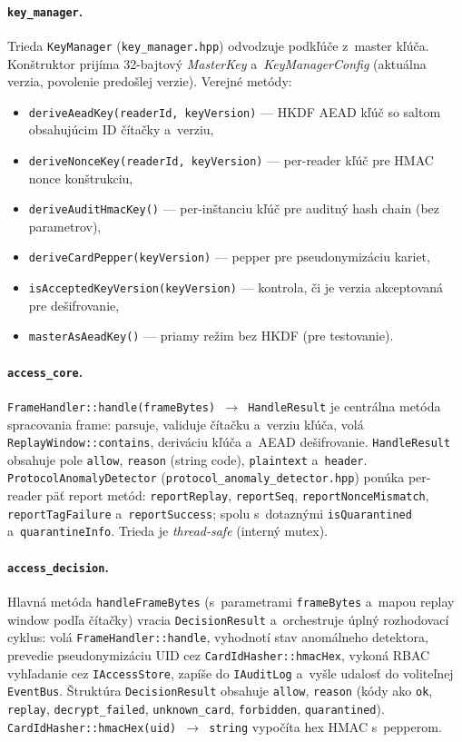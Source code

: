 \documentclass[a4paper]{feidipsp}
\begin{document}
\paragraph{\texttt{key\_manager}.}
Trieda \texttt{KeyManager} (\texttt{key\_manager.hpp}) odvodzuje podkľúče z~master kľúča. Konštruktor prijíma 32-bajtový \emph{MasterKey} a~\emph{KeyManagerConfig} (aktuálna verzia, povolenie predošlej verzie). Verejné metódy:
\begin{itemize}
\item \texttt{deriveAeadKey(readerId, keyVersion)} --- HKDF AEAD kľúč so saltom obsahujúcim ID čítačky a~verziu,
\item \texttt{deriveNonceKey(readerId, keyVersion)} --- per-reader kľúč pre HMAC nonce konštrukciu,
\item \texttt{deriveAuditHmacKey()} --- per-inštanciu kľúč pre auditný hash chain (bez parametrov),
\item \texttt{deriveCardPepper(keyVersion)} --- pepper pre pseudonymizáciu kariet,
\item \texttt{isAcceptedKeyVersion(keyVersion)} --- kontrola, či je verzia akceptovaná pre dešifrovanie,
\item \texttt{masterAsAeadKey()} --- priamy režim bez HKDF (pre testovanie).
\end{itemize}

\paragraph{\texttt{access\_core}.}
\texttt{FrameHandler::handle(frameBytes) $\rightarrow$ HandleResult} je centrálna metóda spracovania frame: parsuje, validuje čítačku a~verziu kľúča, volá \texttt{ReplayWindow::contains}, deriváciu kľúča a~AEAD dešifrovanie. \texttt{HandleResult} obsahuje pole \texttt{allow}, \texttt{reason} (string code), \texttt{plaintext} a~\texttt{header}. \texttt{ProtocolAnomalyDetector} (\texttt{protocol\_anomaly\_detector.hpp}) ponúka per-reader päť report metód: \texttt{reportReplay}, \texttt{reportSeq}, \texttt{reportNonceMismatch}, \texttt{reportTagFailure} a~\texttt{reportSuccess}; spolu s~dotaznými \texttt{isQuarantined} a~\texttt{quarantineInfo}. Trieda je \emph{thread-safe} (interný mutex).

\paragraph{\texttt{access\_decision}.}
Hlavná metóda \texttt{handleFrameBytes} (s~parametrami \texttt{frameBytes} a~mapou replay window podľa čítačky) vracia \texttt{DecisionResult} a~orchestruje úplný rozhodovací cyklus: volá \texttt{FrameHandler::handle}, vyhodnotí stav anomálneho detektora, prevedie pseudonymizáciu UID cez \texttt{CardIdHasher::hmacHex}, vykoná RBAC vyhľadanie cez \texttt{IAccessStore}, zapíše do \texttt{IAuditLog} a~vyšle udalosť do voliteľnej \texttt{EventBus}. Štruktúra \texttt{DecisionResult} obsahuje \texttt{allow}, \texttt{reason} (kódy ako \texttt{ok}, \texttt{replay}, \texttt{decrypt\_failed}, \texttt{unknown\_card}, \texttt{forbidden}, \texttt{quarantined}). \texttt{CardIdHasher::hmacHex(uid) $\rightarrow$ string} vypočíta hex HMAC s~pepperom.
\end{document}
